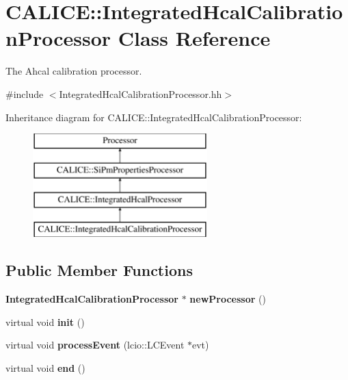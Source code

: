 \section{C\-A\-L\-I\-C\-E\-:\-:Integrated\-Hcal\-Calibration\-Processor Class Reference}
\label{classCALICE_1_1IntegratedHcalCalibrationProcessor}


The Ahcal calibration processor.  




{\ttfamily \#include $<$Integrated\-Hcal\-Calibration\-Processor.\-hh$>$}

Inheritance diagram for C\-A\-L\-I\-C\-E\-:\-:Integrated\-Hcal\-Calibration\-Processor\-:\begin{figure}[H]
\begin{center}
\leavevmode
\includegraphics[height=4.000000cm]{classCALICE_1_1IntegratedHcalCalibrationProcessor}
\end{center}
\end{figure}
\subsection*{Public Member Functions}
\begin{DoxyCompactItemize}
\item 
{\bf Integrated\-Hcal\-Calibration\-Processor} $\ast$ {\bfseries new\-Processor} ()\label{classCALICE_1_1IntegratedHcalCalibrationProcessor_a598bbbd1a328ce27442d3a9d026b9867}

\item 
virtual void {\bfseries init} ()\label{classCALICE_1_1IntegratedHcalCalibrationProcessor_afcb4ac8fef8a5bcc1fd5ae4b8620af85}

\item 
virtual void {\bfseries process\-Event} (lcio\-::\-L\-C\-Event $\ast$evt)\label{classCALICE_1_1IntegratedHcalCalibrationProcessor_acf33ed983e6e78fc7c70c5a0082d9cf0}

\item 
virtual void {\bfseries end} ()\label{classCALICE_1_1IntegratedHcalCalibrationProcessor_a8f73d365b94979a80808dc903cfc9c00}

\end{DoxyCompactItemize}

